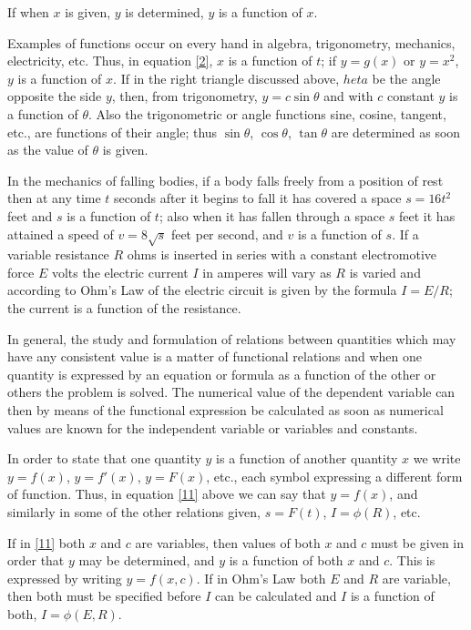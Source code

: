 If when $x$ is given, $y$ is determined, $y$ is a function of $x$.

Examples of functions occur on every hand in algebra, trigonometry, mechanics, electricity, etc. Thus, in equation \eqref{2}, $x$ is a function of $t$; if $y = g(x)$ or $y = x^2$, $y$ is a function of $x$. If in the right triangle discussed above, $	heta$ be the angle opposite the side $y$, then, from trigonometry, $y = c \sin \theta$ and with $c$ constant $y$ is a function of $\theta$. Also the trigonometric or angle functions sine, cosine, tangent, etc., are functions of their angle; thus $\sin \theta$, $\cos \theta$, $\tan \theta$ are determined as soon as the value of $\theta$ is given.

In the mechanics of falling bodies, if a body falls freely from a position of rest then at any time $t$ seconds after it begins to fall it has covered a space $s = 16t^2$ feet and $s$ is a function of $t$; also when it has fallen through a space $s$ feet it has attained a speed of $v = 8\sqrt{s}$ feet per second, and $v$ is a function of $s$. If a variable resistance $R$ ohms is inserted in series with a constant electromotive force $E$ volts the electric current $I$ in amperes will vary as $R$ is varied and according to Ohm's Law of the electric circuit is given by the formula $I = E/R$; the current is a function of the resistance.

In general, the study and formulation of relations between quantities which may have any consistent value is a matter of functional relations and when one quantity is expressed by an equation or formula as a function of the other or others the problem is solved. The numerical value of the dependent variable can then by means of the functional expression be calculated as soon as numerical values are known for the independent variable or variables and constants.

In order to state that one quantity $y$ is a function of another quantity $x$ we write $y = f(x)$, $y = f'(x)$, $y = F(x)$, etc., each symbol expressing a different form of function. Thus, in equation \eqref{11} above we can say that $y = f(x)$, and similarly in some of the other relations given, $s = F(t)$, $I = \phi(R)$, etc.

If in \eqref{11} both $x$ and $c$ are variables, then values of both $x$ and $c$ must be given in order that $y$ may be determined, and $y$ is a function of both $x$ and $c$. This is expressed by writing $y = f(x,c)$. If in Ohm's Law both $E$ and $R$ are variable, then both must be specified before $I$ can be calculated and $I$ is a function of both, $I = \phi(E,R)$.

